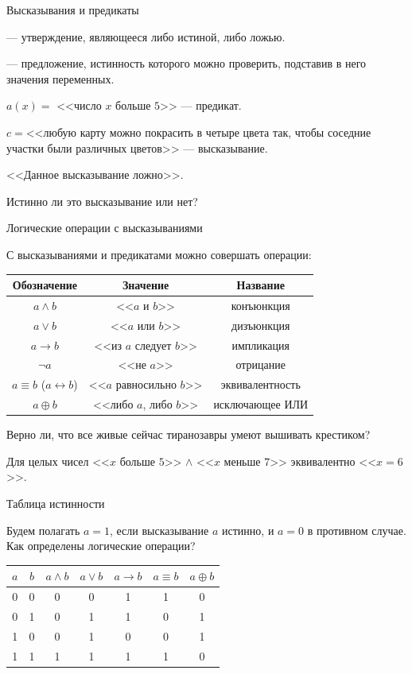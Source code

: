 \begin{frame}{Высказывания и предикаты}

 --- утверждение, являющееся либо истиной, либо ложью.

\spc
{} --- предложение, истинность которого можно проверить, подставив в него значения переменных.

\exmpl $a(x)=$ <<число $x$ больше $5$>> --- предикат. 

$c=$<<любую карту можно покрасить в четыре цвета так, чтобы соседние участки были различных цветов>> --- высказывание.

\spc

\exmpl <<Данное высказывание ложно>>.

Истинно ли это высказывание или нет?

\end{frame}

\begin{frame}{Логические операции с высказываниями}


С высказываниями и предикатами можно совершать операции:
\spc

\begin{tabular}{|c|c|c|}
\hline \bf Обозначение & \bf Значение & \bf Название  \\
\hline $a \wedge b$ & <<$a$ и $b$>> & конъюнкция  \\
\hline $a \vee b$ & <<$a$ или $b$>> & дизъюнкция \\
\hline $a \rightarrow b$ & <<из $a$ следует $b$>> & импликация \\
\hline $\neg a$ & <<не $a$>> & отрицание \\
\hline $a \equiv b$ ($a \leftrightarrow b$)& <<$a$ равносильно $b$>> & эквивалентность\\
\hline $a \oplus b$ & <<либо $a$, либо $b$>> & исключающее
ИЛИ\\
\hline
\end{tabular}

\exmpl Верно ли, что все живые сейчас тиранозавры умеют вышивать крестиком?

\exmpl Для целых чисел <<$x$ больше $5$>> $\wedge$ <<$x$ меньше $7$>> эквивалентно <<$x=6$>>.


\end{frame}

\begin{frame}{Таблица истинности}


Будем полагать $a=1$, если высказывание $a$ истинно, и $a=0$ в противном случае.
\spc
Как определены логические операции?
\spc
\begin{tabular}{|c|c|c|c|c|c|c|}
\hline$a$ & $b$ & $a \wedge b$ & $a \vee b$ & $a \rightarrow b$ & $a \equiv b$ & $a \oplus b$ \\
\hline 0 & 0 & 0 & 0 & 1 & 1 & 0 \\
\hline 0 & 1 & 0 & 1 & 1 & 0 & 1 \\
\hline 1 & 0 & 0 & 1 & 0 & 0 & 1 \\
\hline 1 & 1 & 1 & 1 & 1 & 1 & 0 \\
\hline
\end{tabular}

\end{frame}

